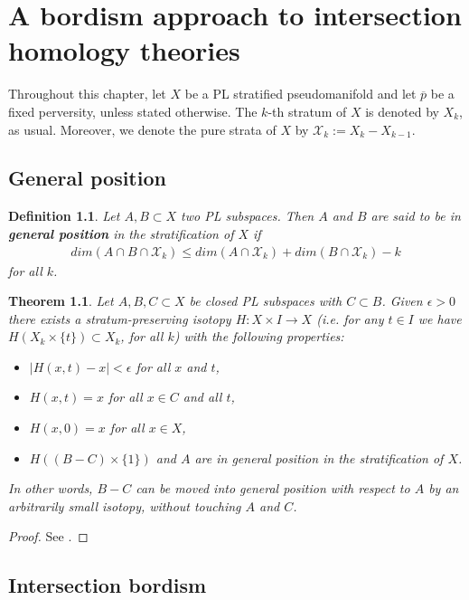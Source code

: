 \documentclass{scrreprt}
\newtheorem{theorem}[prop]{Theorem}
\newtheorem{definition}[prop]{Definition}
\begin{document}
\chapter{A bordism approach to intersection homology theories}\label{IOmega}
Throughout this chapter, let $X$ be a PL stratified pseudomanifold and let $\overline{p}$ be a fixed perversity, unless stated otherwise. The $k$-th stratum of $X$ is denoted by $X_k$, as usual. Moreover, we denote the pure strata of $X$ by $\mathcal{X}_k:= X_k - X_{k-1}$.

\section{General position}

\begin{definition}
Let $A,B \subset X$ two PL subspaces. Then $A$ and $B$ are said to be in \textbf{general position} in the stratification of $X$ if
\begin{align*}
dim(A \cap B \cap \mathcal{X}_k) \leq dim(A \cap \mathcal{X}_k) + dim(B \cap \mathcal{X}_k) -k
\end{align*}
for all $k$.
\end{definition}

\begin{theorem}
Let $A,B,C \subset X$ be closed PL subspaces with $C \subset B$. Given $\epsilon > 0$ there exists a stratum-preserving isotopy $H: X \times I \to X$ (i.e. for any $t \in I$ we have $H(X_k \times \{ t \} ) \subset X_k$, for all $k$) with the following properties:
\begin{itemize}
\item[1.] $|H(x,t)-x| < \epsilon$ for all $x$ and $t$,
\item[2.] $H(x,t)=x$ for all $x \in C$ and all $t$,
\item[3.] $H(x,0)=x$ for all $x \in X$,
\item[4.] $H((B-C) \times \{ 1 \})$ and $A$ are in general position in the stratification of $X$.
\end{itemize}
In other words, $B-C$ can be moved into general position with respect to $A$ by an arbitrarily small isotopy, without touching $A$ and $C$.
\end{theorem}

\begin{proof}
See \cite{mccrory}.
\end{proof}

\section{Intersection bordism}
\end{document}

